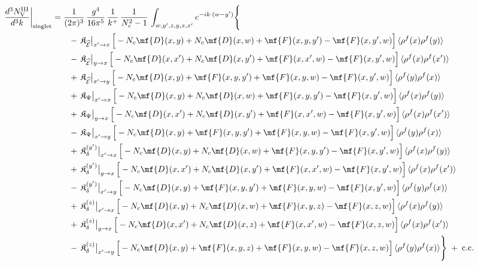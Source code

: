 \begin{align}
\frac{d^{3}N^{\rm III}_{\rm V}}{d^{3}k}\bigg|_{\rm singlet}&=\frac{1}{(2\pi)^{3}}\,\frac{g^{4}}{16\pi^{5}}\,\frac{1}{k^{+}}\,\frac{1}{N_{c}^{2}-1}\,\int_{w,y',z,y,x,x'}e^{-ik\cdot(w-y')}\Bigg\{\notag\\
&\qquad -\,\mathfrak{K}_{\widehat{\mathcal{E}}}\big|_{x'\to x}\,\Big[-N_{c}\mf{D}(x,y)+N_{c}\mf{D}(x,w)+\mf{F}(x,y,y')-\mf{F}(x,y',w)\Big]\,\langle\rho^{f}(x)\rho^{f}(y)\rangle\notag\\
&\qquad -\,\mathfrak{K}_{\widehat{\mathcal{E}}}\big|_{y\to x}\,\Big[-N_{c}\mf{D}(x,x')+N_{c}\mf{D}(x,y')+\mf{F}(x,x',w)-\mf{F}(x,y',w)\Big]\,\langle\rho^{f}(x)\rho^{f}(x')\rangle\notag\\
&\qquad +\,\mathfrak{K}_{\widehat{\mathcal{E}}}\big|_{x'\to y}\,\Big[-N_{c}\mf{D}(x,y)+\mf{F}(x,y,y')+\mf{F}(x,y,w)-\mf{F}(x,y',w)\Big]\,\langle\rho^{f}(y)\rho^{f}(x)\rangle\notag\\
&\qquad +\,\mathfrak{K}_{\Psi}\big|_{x'\to x}\,\Big[-N_{c}\mf{D}(x,y)+N_{c}\mf{D}(x,w)+\mf{F}(x,y,y')-\mf{F}(x,y',w)\Big]\,\langle\rho^{f}(x)\rho^{f}(y)\rangle\notag\\
&\qquad +\,\mathfrak{K}_{\Psi}\big|_{y\to x}\,\Big[-N_{c}\mf{D}(x,x')+N_{c}\mf{D}(x,y')+\mf{F}(x,x',w)-\mf{F}(x,y',w)\Big]\,\langle\rho^{f}(x)\rho^{f}(x')\rangle\notag\\
&\qquad -\,\mathfrak{K}_{\Psi}\big|_{x'\to y}\,\Big[-N_{c}\mf{D}(x,y)+\mf{F}(x,y,y')+\mf{F}(x,y,w)-\mf{F}(x,y',w)\Big]\,\langle\rho^{f}(y)\rho^{f}(x)\rangle\notag\\
&\qquad +\,\mathfrak{K}_{\delta}^{(y')}\big|_{x'\to x}\,\Big[-N_{c}\mf{D}(x,y)+N_{c}\mf{D}(x,w)+\mf{F}(x,y,y')-\mf{F}(x,y',w)\Big]\,\langle\rho^{f}(x)\rho^{f}(y)\rangle\notag\\
&\qquad +\,\mathfrak{K}_{\delta}^{(y')}\big|_{y\to x}\,\Big[-N_{c}\mf{D}(x,x')+N_{c}\mf{D}(x,y')+\mf{F}(x,x',w)-\mf{F}(x,y',w)\Big]\,\langle\rho^{f}(x)\rho^{f}(x')\rangle\notag\\
&\qquad -\,\mathfrak{K}_{\delta}^{(y')}\big|_{x'\to y}\,\Big[-N_{c}\mf{D}(x,y)+\mf{F}(x,y,y')+\mf{F}(x,y,w)-\mf{F}(x,y',w)\Big]\,\langle\rho^{f}(y)\rho^{f}(x)\rangle\notag\\
&\qquad +\,\mathfrak{K}_{\delta}^{(z)}\big|_{x'\to x}\,\Big[-N_{c}\mf{D}(x,y)+N_{c}\mf{D}(x,w)+\mf{F}(x,y,z)-\mf{F}(x,z,w)\Big]\,\langle\rho^{f}(x)\rho^{f}(y)\rangle\notag\\
&\qquad +\,\mathfrak{K}_{\delta}^{(z)}\big|_{y\to x}\,\Big[-N_{c}\mf{D}(x,x')+N_{c}\mf{D}(x,z)+\mf{F}(x,x',w)-\mf{F}(x,z,w)\Big]\,\langle\rho^{f}(x)\rho^{f}(x')\rangle\notag\\
&\qquad -\,\mathfrak{K}_{\delta}^{(z)}\big|_{x'\to y}\,\Big[-N_{c}\mf{D}(x,y)+\mf{F}(x,y,z)+\mf{F}(x,y,w)-\mf{F}(x,z,w)\Big]\,\langle\rho^{f}(y)\rho^{f}(x)\rangle\Bigg\}\;+\;{\rm c.c.}\label{eq:s-III-V}
\end{align}

